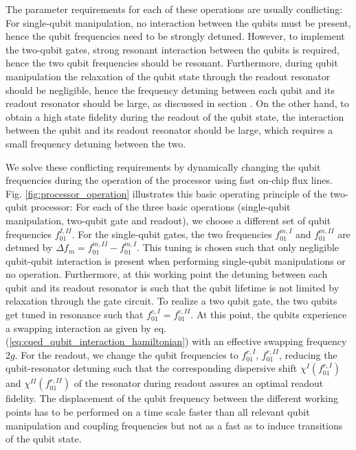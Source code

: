 The parameter requirements for each of these operations are usually conflicting: For single-qubit manipulation, no interaction between the qubits must be present, hence the qubit frequencies need to be strongly detuned. However, to implement the two-qubit gates, strong resonant interaction between the qubits is required, hence the two qubit frequencies should be resonant. Furthermore, during qubit manipulation the relaxation of the qubit state through the readout resonator should be negligible, hence the frequency detuning between each qubit and its readout resonator should be large, as discussed in section \label{section:decoherence_in_cqed}. On the other hand, to obtain a high state fidelity during the readout of the qubit state, the interaction between the qubit and its readout resonator should be large, which requires a small frequency detuning between the two.

\small

We solve these conflicting requirements by dynamically changing the qubit frequencies during the operation of the processor using fast on-chip flux lines. Fig. \ref{fig:processor_operation} illustrates this basic operating principle of the two-qubit processor: For each of the three basic operations (single-qubit manipulation, two-qubit gate and readout), we choose a different set of qubit frequencies $f_{01}^{I,II}$. For the single-qubit gates, the two frequencies $f_{01}^{m,I}$ and $f_{01}^{m,II}$ are detuned by $\Delta f_m = f_{01}^{m,II}-f_{01}^{m,I}$. This tuning is chosen such that only negligible qubit-qubit interaction is present when performing single-qubit manipulations or no operation. Furthermore, at this working point the detuning between each qubit and its readout resonator is such that the qubit lifetime is not limited by relaxation through the gate circuit. To realize a two qubit gate, the two qubits get tuned in resonance such that $f_{01}^{c,I} = f_{01}^{c,II}$. At this point, the qubits experience a swapping interaction as given by eq. (\ref{eq:cqed_qubit_interaction_hamiltonian}) with an effective swapping frequency $2g$. For the readout, we change the qubit frequencies to $f_{01}^{r,I}$, $f_{01}^{r,II}$, reducing the qubit-resonator detuning such that the corresponding dispersive shift $\chi^I(f_{01}^{r,I})$ and $\chi^{II}(f_{01}^{r,II})$ of the resonator during readout assures an optimal readout fidelity. The displacement of the qubit frequency between the different working points has to be performed on a time scale faster than all relevant qubit manipulation and coupling frequencies but not as a fast as to induce transitions of the qubit state.

